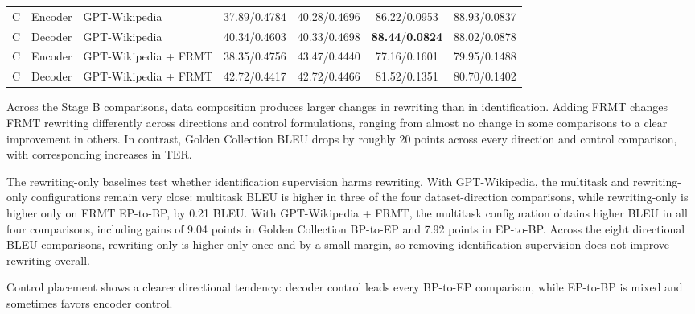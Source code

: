 \documentclass[acmtog,nonacm]{acmart}
\begin{document}
\begin{table}[tbp]
\begin{tabular}{@{}clp{4.4cm}cccc@{}}
\midrule
C & Encoder & GPT-Wikipedia & 37.89/0.4784 & 40.28/0.4696 & 86.22/0.0953 & 88.93/0.0837 \\
C & Decoder & GPT-Wikipedia & 40.34/0.4603 & 40.33/0.4698 & \textbf{88.44}/\textbf{0.0824} & 88.02/0.0878 \\
C & Encoder & GPT-Wikipedia + FRMT & 38.35/0.4756 & 43.47/0.4440 & 77.16/0.1601 & 79.95/0.1488 \\
C & Decoder & GPT-Wikipedia + FRMT & 42.72/0.4417 & 42.72/0.4466 & 81.52/0.1351 & 80.70/0.1402 \\
\bottomrule
\end{tabular}
\end{table}

Across the Stage B comparisons, data composition produces larger changes in
rewriting than in identification. Adding FRMT changes FRMT rewriting differently across directions and control
formulations, ranging from almost no change in some comparisons to a clear
improvement in others. In contrast, Golden Collection BLEU drops by roughly 20
points across every direction and control comparison, with corresponding
increases in TER.

The rewriting-only baselines test whether identification supervision harms
rewriting. With GPT-Wikipedia, the multitask and rewriting-only configurations
remain very close: multitask BLEU is higher in three of the four
dataset-direction comparisons, while rewriting-only is higher only on FRMT
EP-to-BP, by 0.21 BLEU. With GPT-Wikipedia + FRMT, the multitask configuration
obtains higher BLEU in all four comparisons, including gains of 9.04 points in
Golden Collection BP-to-EP and 7.92 points in EP-to-BP. Across the eight
directional BLEU comparisons, rewriting-only is higher only once and by a small
margin, so removing identification
supervision does not improve rewriting overall.

Control placement shows a clearer directional tendency: decoder control leads every BP-to-EP comparison, while EP-to-BP is mixed and sometimes favors encoder control.
\end{document}
